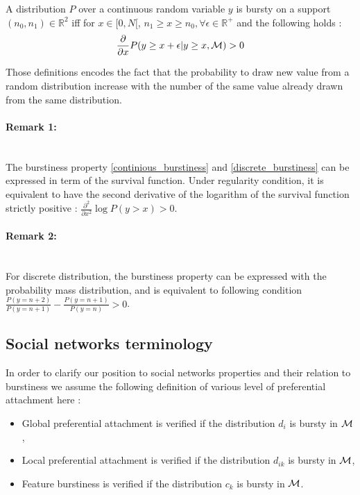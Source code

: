 \begin{definition} \label{continious_burstiness}
    A  distribution $P$ over a continuous random variable $y$ is bursty on a support $(n_0, n_1) \in \mathbb{R}^2$ iff for $x \in [0, N[$,  $n_1 \geq x \geq n_0, \forall \epsilon \in \mathbb{R^+}$ and the following holds : 
    \begin{equation}
        \frac{\partial}{\partial x}P(y \geq x+\epsilon | y \geq x, \mathcal{M}) > 0
    \end{equation}
\end{definition}

Those definitions encodes the fact that the probability to draw new value from a random distribution increase with the number of the same value already drawn from the same distribution.

\paragraph{Remark 1:}~\\
The burstiness property \ref{continious_burstiness} and \ref{discrete_burstiness} can be expressed in term of the survival function. Under regularity  condition, it is equivalent to have the second derivative of the logarithm of the survival function strictly positive \cite{clinchant2010information} : 
$ \frac{\partial^2}{\partial x^2} \log P(y>x) > 0$.

\paragraph{Remark 2:}~\\ \label{eq:burst_mass}
For discrete distribution, the burstiness property can be expressed with the probability mass distribution, and is equivalent to following condition $\frac{P(y = n+2)}{P(y=n+1)} - \frac{P(y = n+1)}{P(y=n)} > 0$.

\subsection{Social networks terminology}

In order to clarify our position to social networks properties and their relation to burstiness we assume the following definition of various level of preferential attachment here :
\begin{itemize}
    \item Global preferential attachment is verified if the distribution $d_i$ is bursty in $\mathcal{M}$,
    \item Local preferential attachment is verified if the distribution $d_{ik}$ is bursty in $\mathcal{M}$,
    \item Feature burstiness is verified if the distribution $c_k$ is bursty in $\mathcal{M}$.
\end{itemize}


